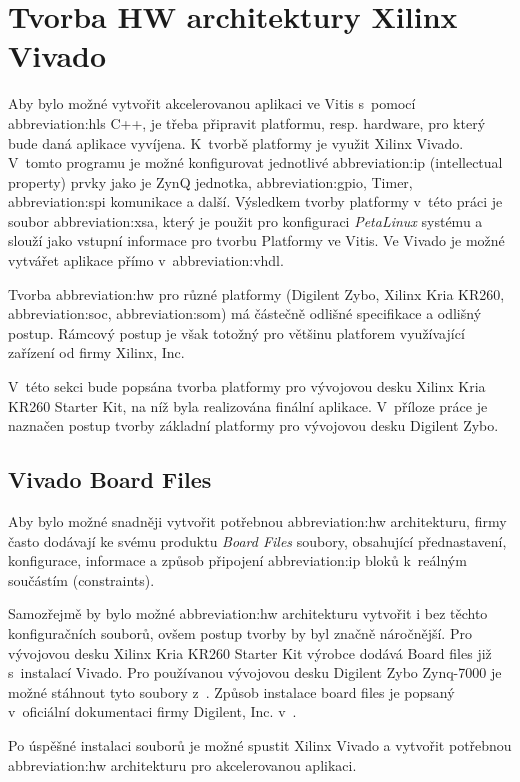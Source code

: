 \documentclass[a4paper, twoside, 11pt]{article}
\begin{document}
	\section{Tvorba HW architektury Xilinx Vivado}
		Aby bylo možné vytvořit akcelerovanou aplikaci ve Vitis s~pomocí \gls{abbreviation:hls} C++, je třeba připravit platformu, resp. hardware, pro který bude daná aplikace vyvíjena. K~tvorbě platformy je využit Xilinx Vivado. V~tomto programu je možné konfigurovat jednotlivé \gls{abbreviation:ip} (intellectual property) prvky jako je ZynQ jednotka, \gls{abbreviation:gpio}, Timer, \gls{abbreviation:spi} komunikace a další. Výsledkem tvorby platformy v~této práci je soubor \gls{abbreviation:xsa}, který je použit pro konfiguraci \textit{PetaLinux} systému a slouží jako vstupní informace pro tvorbu Platformy ve Vitis. Ve Vivado je možné vytvářet aplikace přímo v~\gls{abbreviation:vhdl}.\par
		Tvorba \gls{abbreviation:hw} pro různé platformy (Digilent Zybo, Xilinx Kria KR260, \gls{abbreviation:soc}, \gls{abbreviation:som}) má částečně odlišné specifikace a odlišný postup. Rámcový postup je však totožný pro většinu platforem využívající zařízení od firmy Xilinx, Inc.\par
		V~této sekci bude popsána tvorba platformy pro vývojovou desku Xilinx Kria KR260 Starter Kit, na níž byla realizována finální aplikace. V~příloze práce je naznačen postup tvorby základní platformy pro vývojovou desku Digilent Zybo.\par

		\subsection{Vivado Board Files}\label{subsec:vivado-board-files}
			Aby bylo možné snadněji vytvořit potřebnou \gls{abbreviation:hw} architekturu, firmy často dodávají ke svému produktu \textit{Board Files} soubory, obsahující přednastavení, konfigurace, informace a způsob připojení \gls{abbreviation:ip} bloků k~reálným součástím (constraints). \cite{github-vivado-board-files-for-digilent-fpga-boards}\par
			Samozřejmě by bylo možné \gls{abbreviation:hw} architekturu vytvořit i bez těchto konfiguračních souborů, ovšem postup tvorby by byl značně náročnější. Pro vývojovou desku Xilinx Kria KR260 Starter Kit výrobce dodává Board files již s~instalací Vivado. Pro používanou vývojovou desku Digilent Zybo Zynq-7000 je možné stáhnout tyto soubory z~\cite{github-vivado-board-files-for-digilent-fpga-boards}. Způsob instalace board files je popsaný v~oficiální dokumentaci firmy Digilent, Inc. v~\cite{digilent-installing-vivado-vitis-and-digilent-board-files}.\par
			Po úspěšné instalaci souborů je možné spustit Xilinx Vivado a vytvořit potřebnou \gls{abbreviation:hw} architekturu pro akcelerovanou aplikaci.\par
			
\end{document}
